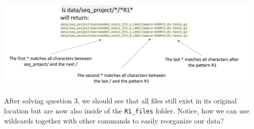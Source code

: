 \documentclass[
  letterpaper,
  DIV=11,
  numbers=noendperiod]{scrreprt}
\begin{document}
\begin{tcolorbox}
\includegraphics[width=5.09375in,height=\textheight]{../img/wildcards_3.png}

After solving question 3, we should see that all files still exist in
its original location but are now also inside of the \texttt{R1\_files}
folder. Notice, how we can use wildcards together with other commands to
easily reorganize our data?

\end{tcolorbox}
\end{document}
